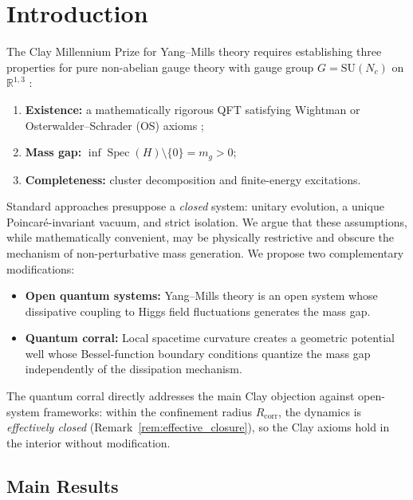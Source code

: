 \documentclass[12pt,a4paper]{article}
\theoremstyle{definition}
\DeclareMathOperator{\Spec}{Spec}
\newcommand{\Rcorr}{R_{\mathrm{corr}}}
\begin{document}
\tableofcontents
\newpage

\section{Introduction}
\label{sec:intro}

The Clay Millennium Prize for Yang--Mills theory requires establishing
three properties for pure non-abelian gauge theory with gauge group
$G = \mathrm{SU}(N_{c})$ on $\mathbb{R}^{1,3}$ \cite{Clay}:
\begin{enumerate}
  \item \textbf{Existence:} a mathematically rigorous QFT satisfying
        Wightman or Osterwalder--Schrader (OS) axioms
        \cite{Wightman,Osterwalder};
  \item \textbf{Mass gap:} $\inf \Spec(H) \setminus \{0\} = m_{g} > 0$;
  \item \textbf{Completeness:} cluster decomposition and finite-energy
        excitations.
\end{enumerate}

Standard approaches presuppose a \emph{closed} system: unitary evolution, a
unique Poincar\'{e}-invariant vacuum, and strict isolation. We argue that
these assumptions, while mathematically convenient, may be physically
restrictive and obscure the mechanism of non-perturbative mass generation.
We propose two complementary modifications:

\begin{itemize}
  \item \textbf{Open quantum systems:} Yang--Mills theory is an open system
        whose dissipative coupling to Higgs field fluctuations generates the
        mass gap.
  \item \textbf{Quantum corral:} Local spacetime curvature creates a
        geometric potential well whose Bessel-function boundary conditions
        quantize the mass gap independently of the dissipation mechanism.
\end{itemize}

The quantum corral directly addresses the main Clay objection against
open-system frameworks: within the confinement radius $\Rcorr$, the dynamics
is \emph{effectively closed} (Remark~\ref{rem:effective_closure}), so the
Clay axioms hold in the interior without modification.

\subsection{Main Results}
\end{document}
